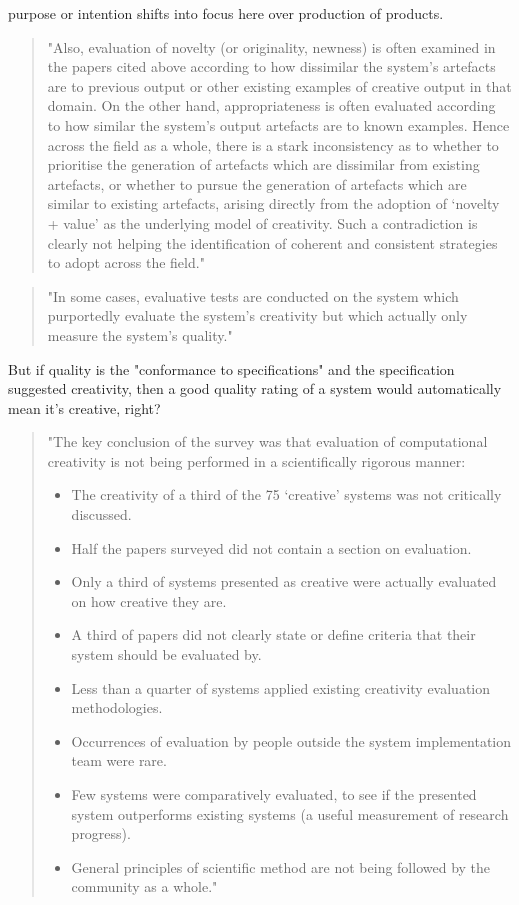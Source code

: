 purpose or intention shifts into focus here over production of products.

\begin{quote}
"Also, evaluation of novelty (or originality, newness) is often examined in the papers cited above according to how dissimilar the system’s artefacts are to previous output or other existing examples of creative output in that domain. On the other hand, appropriateness is often evaluated according to how similar the system’s output artefacts are to known examples. Hence across the field as a whole, there is a stark inconsistency as to whether to prioritise the generation of artefacts which are dissimilar from existing artefacts, or whether to pursue the generation of artefacts which are similar to existing artefacts, arising directly from the adoption of ‘novelty + value’ as the underlying model of creativity. Such a contradiction is clearly not helping the identification of coherent and consistent strategies to adopt across the field." \citep{Jordanous2012}
\end{quote}

\begin{quote}
"In some cases, evaluative tests are conducted on the system which purportedly evaluate the system’s creativity but which actually only measure the system’s quality." \citep{Jordanous2012}
\end{quote}

But if quality is the "conformance to specifications" and the specification suggested creativity, then a good quality rating of a system would automatically mean it's creative, right?

\begin{quote}
"The key conclusion of the survey was that evaluation of computational creativity is not being performed in a scientifically rigorous manner:
\begin{itemize}
\item The creativity of a third of the 75 ‘creative’ systems was not critically discussed.
\item Half the papers surveyed did not contain a section on evaluation.
\item Only a third of systems presented as creative were actually evaluated on how creative they are.
\item A third of papers did not clearly state or define criteria that their system should be evaluated by.
\item Less than a quarter of systems applied existing creativity evaluation methodologies.
\item Occurrences of evaluation by people outside the system implementation team were rare.
\item Few systems were comparatively evaluated, to see if the presented system outperforms existing systems (a useful measurement of research progress).
\item General principles of scientific method are not being followed by the community as a whole." \citep{Jordanous2012}
\end{itemize}
\end{quote}

